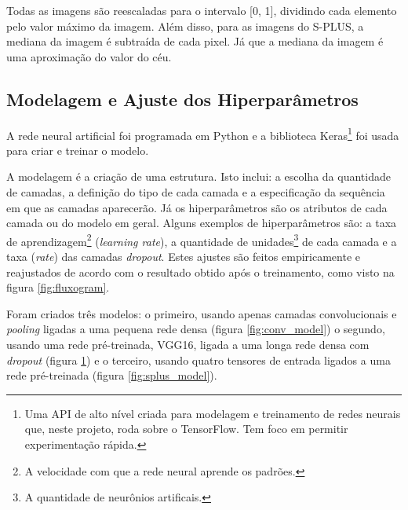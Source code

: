 Todas as imagens são reescaladas para o intervalo [0, 1], dividindo cada elemento pelo valor máximo da imagem. Além disso, para as imagens do S-PLUS, a mediana da imagem é subtraída de cada pixel. Já que a mediana da imagem é uma aproximação do valor do céu.

\subsection{Modelagem e Ajuste dos Hiperparâmetros}

A rede neural artificial foi programada em Python e a biblioteca Keras\footnote{Uma API de alto nível criada para modelagem e treinamento de redes neurais que, neste projeto, roda sobre o TensorFlow. Tem foco em permitir experimentação rápida.} foi usada para criar e treinar o modelo.

A modelagem é a criação de uma estrutura. Isto inclui: a escolha da quantidade de camadas, a definição do tipo de cada camada e a especificação da sequência em que as camadas aparecerão. Já os hiperparâmetros são os atributos de cada camada ou do modelo em geral. Alguns exemplos de hiperparâmetros são: a taxa de aprendizagem\footnote{A velocidade com que a rede neural aprende os padrões.} (\emph{learning rate}), a quantidade de unidades\footnote{A quantidade de neurônios artificais.} de cada camada e a taxa (\emph{rate}) das camadas \emph{dropout}. Estes ajustes são feitos empiricamente e reajustados de acordo com o resultado obtido após o treinamento, como visto na figura \ref{fig:fluxogram}.

Foram criados três modelos: o primeiro, usando apenas camadas convolucionais e \emph{pooling} ligadas a uma pequena rede densa (figura \ref{fig:conv_model}) o segundo, usando uma rede pré-treinada, VGG16, ligada a uma longa rede densa com \emph{dropout} (figura \ref{fig:pretrained_model}) e o terceiro, usando quatro tensores de entrada ligados a uma rede pré-treinada (figura \ref{fig:splus_model}).

\pagebreak
\begin{figure}[ht!]
  \centering
  \begin{minipage}[t]{.47\textwidth}
    \centering
    
    \label{fig:conv_model}
  \end{minipage}%
  \hfill%
  \begin{minipage}[t]{.47\textwidth}
    \centering
    
    \label{fig:pretrained_model}
  \end{minipage}
\end{figure}
\pagebreak

